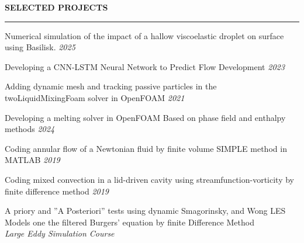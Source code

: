 \documentclass[10pt]{article}
\begin{document}

		
		
			
		\vspace{2mm}
			 
		
	
		
		
		
		\vspace{-2mm}
		
		
		
		\vspace{2mm}
		
		\noindent \textbf{\color{violet} SELECTED PROJECTS}
		
		\vspace{-2mm}
		
		\noindent\rule[0.5ex]{\linewidth}{1pt}
		
		{\noindent Numerical simulation of the impact of a hallow viscoelastic droplet on surface using Basilisk. 
		\hfill {\em 2025} 
		
		
		\vspace{0.5mm}
		
		{\noindent Developing a CNN-LSTM Neural Network to Predict Flow Development
			\hfill {\em 2023} 
			
			
		{\noindent  Adding dynamic mesh and tracking passive particles in the twoLiquidMixingFoam solver in OpenFOAM
	    \hfill {\em 2021}  
	
	\vspace{0.5mm}
	
	{\noindent  Developing a melting solver in OpenFOAM Based on phase field and enthalpy methods
		\hfill {\em 2024} 
		
		\vspace{1.5mm}
		
		{\noindent Coding annular flow of a Newtonian fluid by finite volume SIMPLE method in MATLAB  
			\hfill {\em 2019} 
			
	\vspace{1.5mm}
	
	{\noindent  Coding mixed convection in a lid-driven cavity using streamfunction-vorticity by finite difference method
		\hfill {\em 2019} 
		
		\vspace{1.5mm}
		
		{\noindent A priory and ”A Posteriori” tests using dynamic Smagorinsky, and Wong LES Models one the filtered Burgers’ equation by finite Difference Method
			\\ \textit{Large Eddy Simulation Course}
			\vspace{1.5mm}
			
}}}}}}}
\end{document}
